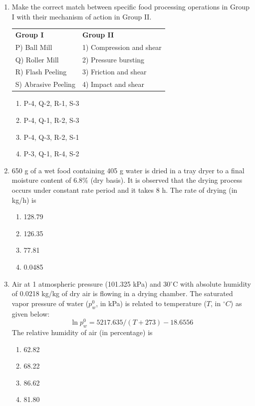 \documentclass[journal,12pt,onecolumn]{IEEEtran}
\begin{document}
\begin{enumerate}[label=\arabic*.]
\item Make the correct match between specific food processing operations in Group I with their mechanism of action in Group II.
\begin{center}
\begin{tabular}{p{6cm} p{6cm}}
\textbf{Group I} & \textbf{Group II} \\
P) Ball Mill & 1) Compression and shear \\
Q) Roller Mill & 2) Pressure bursting \\
R) Flash Peeling & 3) Friction and shear \\
S) Abrasive Peeling & 4) Impact and shear \\
\end{tabular}
\end{center}
\begin{multicols}{2}
\begin{enumerate}[label=(\Alph*)]
\item P-4, Q-2, R-1, S-3
\item P-4, Q-1, R-2, S-3
\item P-4, Q-3, R-2, S-1
\item P-3, Q-1, R-4, S-2
\end{enumerate}
\end{multicols}

\item 650 g of a wet food containing 405 g water is dried in a tray dryer to a final moisture content of 6.8\% (dry basis). It is observed that the drying process occurs under constant rate period and it takes 8 h. The rate of drying (in kg/h) is
\begin{multicols}{4}
\begin{enumerate}[label=(\Alph*)]
\item 128.79
\item 126.35
\item 77.81
\item 0.0485
\end{enumerate}
\end{multicols}

\item Air at 1 atmospheric pressure (101.325 kPa) and 30$^\circ$C with absolute humidity of 0.0218 kg/kg of dry air is flowing in a drying chamber. The saturated vapor pressure of water ($p_w^0$, in kPa) is related to temperature ($T$, in $^{\circ}C$) as given below:
\[
\ln p_w^0 =  5217.635 / (T + 273) - 18.6556
\]
The relative humidity of air (in percentage) is
\begin{multicols}{4}
\begin{enumerate}[label=(\Alph*)]
\item 62.82
\item 68.22
\item 86.62
\item 81.80
\end{enumerate}
\end{multicols}


\end{enumerate}
\end{document}
